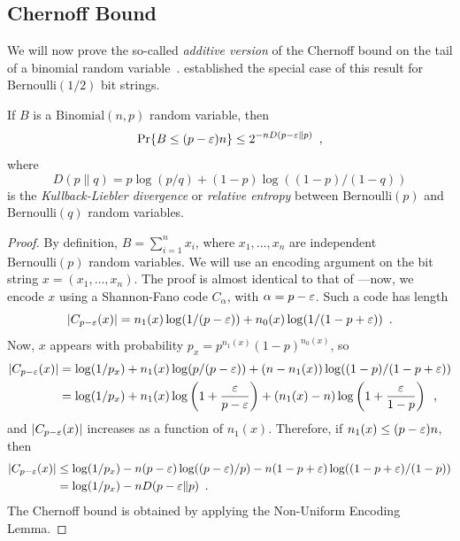 \documentclass{patmorin}
\begin{document}
\subsection{Chernoff Bound}

We will now prove the so-called \emph{additive version} of the
Chernoff bound on the tail of a binomial random
variable~\cite{chernoff:bound}.  established
the special case of this result for $\mathrm{Bernoulli}(1/2)$ bit
strings.

\begin{thm}
  If $B$ is a $\mathrm{Binomial}(n,p)$ random variable, then
  \[
    \Pr\{B\le(p-\varepsilon)n\} \le 2^{-nD(p-\varepsilon \| p)} \enspace ,
  \]
  where 
  \[ 
    D(p \| q)= p\log (p/q) + (1-p)\log ((1 - p)/(1 - q))
  \]
  is the \emph{Kullback-Liebler divergence} or \emph{relative entropy}
  between $\mathrm{Bernoulli}(p)$ and $\mathrm{Bernoulli}(q)$ random
  variables.
\end{thm}

\begin{proof}
  By definition, $B=\sum_{i=1}^n x_i$, where $x_1,\ldots,x_n$ are
  independent $\mathrm{Bernoulli}(p)$ random variables.  We will use
  an encoding argument on the bit string $x=(x_1,\ldots,x_n)$. The
  proof is almost identical to that of ---now,
  we encode $x$ using a Shannon-Fano code $C_\alpha$, with
  $\alpha = p - \varepsilon$. Such a code has length
  \[
    |C_{p - \varepsilon}(x)| = n_1(x) \log (1/(p - \varepsilon)) + n_0(x) \log (1/(1
    - p + \varepsilon)) \enspace .
  \]
  Now, $x$ appears with probability
  $p_x = p^{n_1(x)} (1 - p)^{n_0(x)}$, so
  \begin{align*}
    |C_{p - \varepsilon}(x)| &= \log(1/p_x) + n_1(x) \log (p/(p - \varepsilon)) + (n - n_1(x)) \log ((1 - p)/(1 - p + \varepsilon)) \\
                      &= \log (1/p_x) + n_1(x) \log \left(1 + \frac{\varepsilon}{p - \varepsilon}\right) + (n_1(x) - n) \log \left(1 + \frac{\varepsilon}{1 - p}\right) \enspace ,
  \end{align*}
  and $|C_{p - \varepsilon}(x)|$ increases as a function of
  $n_1(x)$. Therefore, if $n_1(x) \le (p - \varepsilon)n$, then
  \begin{align*}
    |C_{p - \varepsilon}(x)| &\le \log (1/p_x) - n (p - \varepsilon) \log ((p - \varepsilon)/p) - n (1 - p + \varepsilon) \log ((1 - p + \varepsilon)/(1 - p)) \\
                      &= \log (1/p_x) - n D(p - \varepsilon \| p) \enspace .
  \end{align*}
  The Chernoff bound is obtained by applying the Non-Uniform Encoding
  Lemma.
\end{proof}
\end{document}
